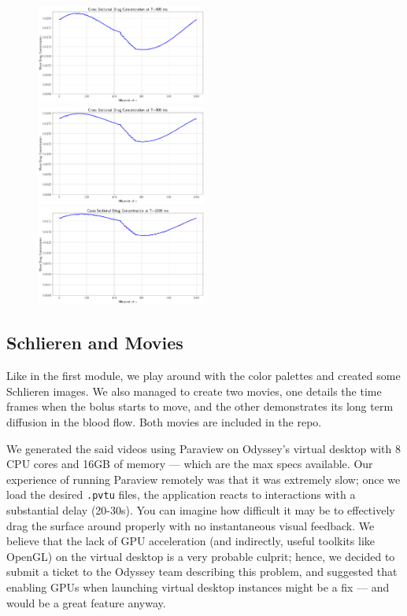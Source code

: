 \documentclass[11pt]{article} %
\newcommand{\tty}[1]{\texttt{#1}}
\begin{document}
\begin{figure}[H]
\includegraphics[width=0.50\textwidth]{drug_profile/drug_profile_t_600.png}\\[0.25in]
\hspace*{-0.25in}
\includegraphics[width=0.50\textwidth]{drug_profile/drug_profile_t_800.png}
\includegraphics[width=0.50\textwidth]{drug_profile/drug_profile_t_1000.png}
\end{figure}

\subsection{Schlieren and Movies}
Like in the first module, we play around with the color palettes and created some Schlieren images. We also managed to create two movies, one details the time frames when the bolus starts to move, and the other demonstrates its long term diffusion in the blood flow. Both movies are included in the repo.

We generated the said videos using Paraview on Odyssey's virtual desktop with 8 CPU cores and 16GB of memory --- which are the max specs available. Our experience of running Paraview remotely was that it was extremely slow; once we load the desired \tty{.pvtu} files, the application reacts to interactions with a substantial delay (20-30s). You can imagine how difficult it may be to effectively drag the surface around properly with no instantaneous visual feedback. We believe that the lack of GPU acceleration (and indirectly, useful toolkits like OpenGL) on the virtual desktop is a very probable culprit; hence, we decided to submit a ticket to the Odyssey team describing this problem, and suggested that enabling GPUs when launching virtual desktop instances might be a fix --- and would be a great feature anyway. 
\end{document}
